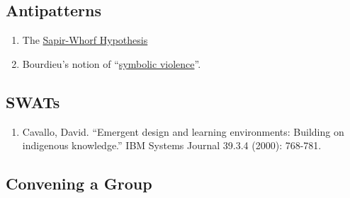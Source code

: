 \hypertarget{antipatterns}{%
\subsection{Antipatterns}\label{antipatterns}}

\begin{enumerate}
\def\labelenumi{\arabic{enumi}.}
\item
  The
  \href{http://en.wikipedia.org/wiki/Linguistic_relativity}{Sapir-Whorf
  Hypothesis}
\item
  Bourdieu's notion of
  ``\href{http://en.wikipedia.org/wiki/Symbolic_violence}{symbolic
  violence}''.
\end{enumerate}

\hypertarget{swats}{%
\subsection{SWATs}\label{swats}}

\begin{enumerate}
\def\labelenumi{\arabic{enumi}.}
\tightlist
\item
  Cavallo, David. ``Emergent design and learning environments: Building
  on indigenous knowledge.'' IBM Systems Journal 39.3.4 (2000): 768-781.
\end{enumerate}

\hypertarget{convening-a-group}{%
\subsection{Convening a Group}\label{convening-a-group}}

